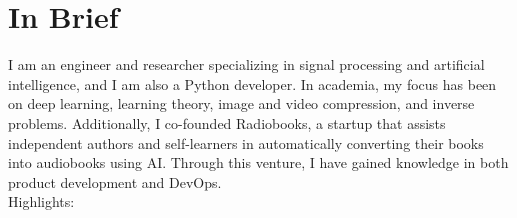 \documentclass[a4paper,11pt]{article}
\begin{document}

  \vspace{16pt}

  \section{In Brief}
    I am an engineer and researcher specializing in signal processing and artificial intelligence, and I am also a Python developer. In academia, my focus has been on deep learning, learning theory, image and video compression, and inverse problems. Additionally, I co-founded Radiobooks, a startup that assists independent authors and self-learners in automatically converting their books into audiobooks using AI. Through this venture, I have gained knowledge in both product development and DevOps.
    \\[10pt]
    Highlights:
    \\[-20pt]
\end{document}
